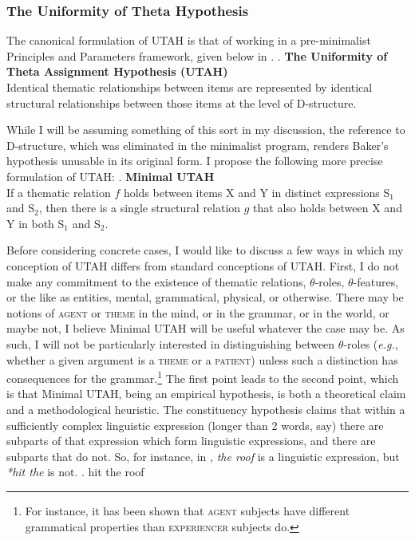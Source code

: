 \documentclass[MilwayThesis]{subfiles}
\begin{document}
\subsubsection{The Uniformity of Theta Hypothesis}
The canonical formulation of UTAH is that of \textcite{baker1988incorporation} working in a pre-minimalist Principles and Parameters framework, given below in \Next.
\ex. \textbf{The Uniformity of Theta Assignment Hypothesis (UTAH)}\\
Identical thematic relationships between items are represented by identical structural relationships between those items at the level of D-structure. \parencite[46]{baker1988incorporation}

While I will be assuming something of this sort in my discussion, the reference to D-structure, which was eliminated in the minimalist program, renders Baker's hypothesis unusable in its original form.
I propose the following more precise formulation of UTAH:
\ex. \textbf{Minimal UTAH}\\
If a thematic relation $f$ holds between items X and Y in distinct expressions S$_1$ and S$_2$, then there is a single structural relation $g$ that also holds between X and Y in both S$_1$ and S$_2$.

Before considering concrete cases, I would like to discuss a few ways in which my conception of UTAH differs from standard conceptions of UTAH.
First, I do not make any commitment to the existence of thematic relations, $\theta$-roles, $\theta$-features, or the like as entities, mental, grammatical, physical, or otherwise.
There may be notions of \textsc{agent} or \textsc{theme} in the mind, or in the grammar, or in the world, or maybe not, I believe Minimal UTAH will be useful whatever the case may be.
As such, I will not be particularly interested in distinguishing between $\theta$-roles (\textit{e.g.}, whether a given argument is a \textsc{theme} or a \textsc{patient}) unless such a distinction has consequences for the grammar.\footnote{
	For instance, it has been shown that \textsc{agent} subjects have different grammatical properties than \textsc{experiencer} subjects do.
}
The first point leads to the second point, which is that Minimal UTAH, being an empirical hypothesis, is both a theoretical claim and a methodological heuristic.
The constituency hypothesis claims that within a sufficiently complex linguistic expression (longer than 2 words, say) there are subparts of that expression which form linguistic expressions, and there are subparts that do not.
So, for instance, in \Next, \textit{the roof} is a linguistic expression, but \textit{*hit the} is not.
\ex. hit the roof
\end{document}
